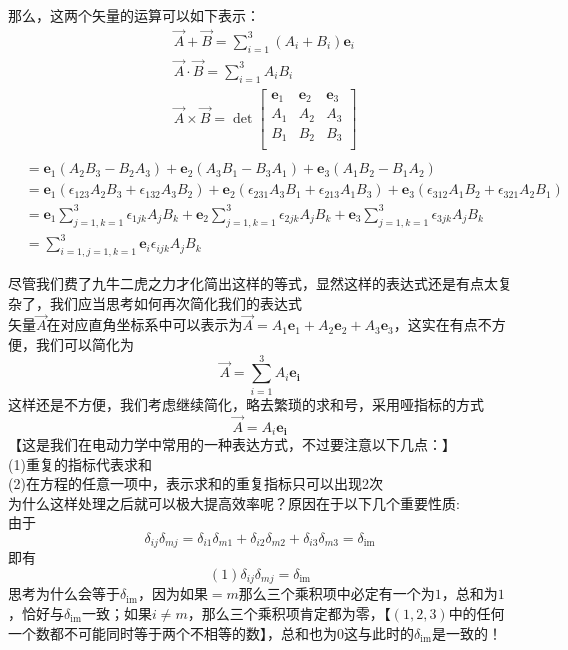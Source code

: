 \documentclass{article}
\newcommand{\ve}{\boldsymbol}
\begin{document}
\begin{CJK}{UTF8}{gkai}
那么，这两个矢量的运算可以如下表示：\\
\[
\begin{aligned}    
&\overrightarrow{A}+\overrightarrow{B}=\sum_{i=1}^3(A_i+B_i)\ve{e}_i\\
&\overrightarrow{A}\cdot\overrightarrow{B}=\sum_{i=1}^3A_i B_i\\
&\overrightarrow{A}\times \overrightarrow{B}=\det
\begin{bmatrix}
    \ve{e}_1&\ve{e}_2&\ve{e}_3\\
    A_1&A_2&A_3\\
    B_1&B_2&B_3\\
\end{bmatrix}\\
\end{aligned}
\]
\[
\begin{aligned}    
&=\ve{e}_1(A_2B_3-B_2A_3)+\ve{e}_2(A_3B_1-B_3A_1)+\ve{e}_3(A_1B_2-B_1A_2)\\
&=\ve{e}_1(\epsilon_{123}A_2B_3+\epsilon_{132}A_3B_2)+\ve{e}_2(\epsilon_{231}A_3B_1+\epsilon_{213}A_1B_3)+\ve{e}_3(\epsilon_{312}A_1B_2+\epsilon_{321}A_2B_1)\\
&=\ve{e}_1\sum_{j=1,k=1}^3\epsilon_{1jk}A_j B_k+\ve{e}_2\sum_{j=1,k=1}^3\epsilon_{2jk}A_j B_k+   \ve{e}_3\sum_{j=1,k=1}^3\epsilon_{3jk}A_j B_k\\
&=\sum_{i=1,j=1,k=1}^3\ve{e}_i \epsilon_{ijk} A_j B_k
\end{aligned}
\]

尽管我们费了九牛二虎之力才化简出这样的等式，显然这样的表达式还是有点太复杂了，我们应当思考如何再次简化我们的表达式\\

矢量$\overrightarrow{A}$在对应直角坐标系中可以表示为$\overrightarrow{A}=A_1\ve{e}_1+A_2\ve{e}_2+A_3\ve{e}_3$，这实在有点不方便，我们可以简化为
\[\overrightarrow{A}=\sum_{i=1}^3 A_i \ve{e_i}\]
这样还是不方便，我们考虑继续简化，略去繁琐的求和号，采用哑指标的方式
\[\overrightarrow{A}=A_i \ve{e_i}\]
【这是我们在电动力学中常用的一种表达方式，不过要注意以下几点：】\\

(1)重复的指标代表求和\\
(2)在方程的任意一项中，表示求和的重复指标只可以出现2次\\

为什么这样处理之后就可以极大提高效率呢？原因在于以下几个重要性质:\\
由于\[\delta_{ij}\delta_{mj}=\delta_{i1}\delta_{m1}+\delta_{i2}\delta_{m2}+\delta_{i3}\delta_{m3}=\delta_{\text{im}}\]
即有\[(1)\delta_{ij}\delta_{mj}=\delta_{\text{im}}\]
思考为什么会等于$\delta_{\text{im}}$，因为如果$=m$那么三个乘积项中必定有一个为$1$，总和为$1$，恰好与$\delta_{\text{im}}$一致；如果$i\neq m$，那么三个乘积项肯定都为零，【$(1,2,3)$中的任何一个数都不可能同时等于两个不相等的数】，总和也为$0$这与此时的$\delta_{\text{im}}$是一致的！\\


\end{CJK}
\end{document}
